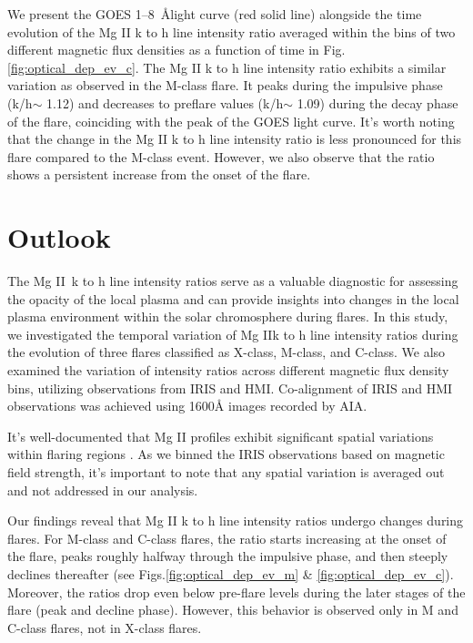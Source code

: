 We present the GOES 1{--}8~{\AA}light curve (red solid line) alongside the time evolution of the Mg II k to h line intensity ratio averaged within the bins of two different magnetic flux densities as a function of time in Fig.\ref{fig:optical_dep_ev_c}. The Mg II k to h line intensity ratio exhibits a similar variation as observed in the M-class flare. It peaks during the impulsive phase (k/h$\sim$ 1.12) and decreases to preflare values (k/h$\sim$ 1.09) during the decay phase of the flare, coinciding with the peak of the GOES light curve. It's worth noting that the change in the Mg II k to h line intensity ratio is less pronounced for this flare compared to the M-class event. However, we also observe that the ratio shows a persistent increase from the onset of the flare.

\section{Outlook}

The Mg II~k to h line intensity ratios serve as a valuable diagnostic for assessing the opacity of the local plasma and can provide insights into changes in the local plasma environment within the solar chromosphere during flares. In this study, we investigated the temporal variation of Mg IIk to h line intensity ratios during the evolution of three flares classified as X-class, M-class, and C-class. We also examined the variation of intensity ratios across different magnetic flux density bins, utilizing observations from IRIS and HMI. Co-alignment of IRIS and HMI observations was achieved using 1600{\AA} images recorded by AIA.

It's well-documented that Mg II profiles exhibit significant spatial variations within flaring regions \citep{dalda23,panos18}. As we binned the IRIS observations based on magnetic field strength, it's important to note that any spatial variation is averaged out and not addressed in our analysis.

Our findings reveal that Mg II k to h line intensity ratios undergo changes during flares. For M-class and C-class flares, the ratio starts increasing at the onset of the flare, peaks roughly halfway through the impulsive phase, and then steeply declines thereafter (see Figs.\ref{fig:optical_dep_ev_m} \& \ref{fig:optical_dep_ev_c}). Moreover, the ratios drop even below pre-flare levels during the later stages of the flare (peak and decline phase). However, this behavior is observed only in M and C-class flares, not in X-class flares.

